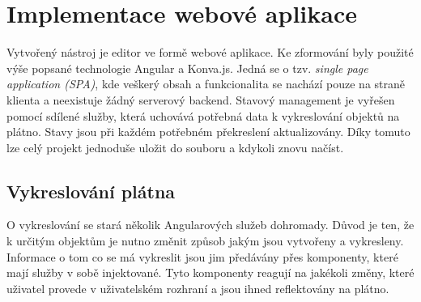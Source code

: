 \chapter{Implementace webové aplikace}
\label{chap:implementation}

Vytvořený nástroj je editor ve formě webové aplikace. Ke zformování byly použité výše popsané technologie Angular a Konva.js. 
Jedná se o tzv. \emph{single page application (SPA)}, kde veškerý obsah a funkcionalita se nachází pouze na straně klienta a neexistuje žádný
serverový backend. Stavový management je vyřešen pomocí sdílené služby, která uchovává potřebná data k vykreslování objektů na plátno.
Stavy jsou při každém potřebném překreslení aktualizovány. Díky tomuto lze celý projekt jednoduše uložit do souboru a kdykoli znovu načíst.
    
\section{Vykreslování plátna}
    O vykreslování se stará několik Angularových služeb dohromady. Důvod je ten, že k určitým objektům je nutno změnit způsob jakým jsou vytvořeny a vykresleny.
    Informace o tom co se má vykreslit jsou jim předávány přes komponenty, které mají služby v sobě injektované. Tyto komponenty reagují
    na jakékoli změny, které uživatel provede v uživatelském rozhraní a jsou ihned reflektovány na plátno.

